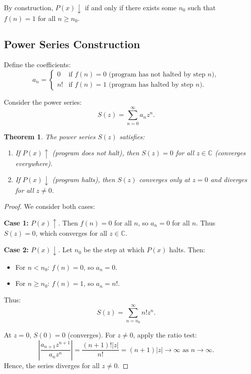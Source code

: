 \documentclass[12pt, a4paper]{article}
\newtheorem{theorem}{Theorem}
\begin{document}
By construction, $P(x)\downarrow$ if and only if there exists some $n_0$ such that $f(n) = 1$ for all $n \geq n_0$.

\subsection{Power Series Construction}
Define the coefficients:
\[
a_n = 
\begin{cases}
0 & \text{if } f(n) = 0 \text{ (program has not halted by step } n), \\
n! & \text{if } f(n) = 1 \text{ (program has halted by step } n).
\end{cases}
\]

Consider the power series:
\[
S(z) = \sum_{n=0}^{\infty} a_n z^n.
\]

\begin{theorem}
The power series $S(z)$ satisfies:
\begin{enumerate}
\item If $P(x)\uparrow$ (program does not halt), then $S(z) = 0$ for all $z \in \mathbb{C}$ (converges everywhere).
\item If $P(x)\downarrow$ (program halts), then $S(z)$ converges only at $z = 0$ and diverges for all $z \neq 0$.
\end{enumerate}
\end{theorem}

\begin{proof}
We consider both cases:

\textbf{Case 1:} $P(x)\uparrow$. Then $f(n) = 0$ for all $n$, so $a_n = 0$ for all $n$. Thus $S(z) = 0$, which converges for all $z \in \mathbb{C}$.

\textbf{Case 2:} $P(x)\downarrow$. Let $n_0$ be the step at which $P(x)$ halts. Then:
\begin{itemize}
\item For $n < n_0$: $f(n) = 0$, so $a_n = 0$.
\item For $n \geq n_0$: $f(n) = 1$, so $a_n = n!$.
\end{itemize}

Thus:
\[
S(z) = \sum_{n=n_0}^{\infty} n! z^n.
\]

At $z = 0$, $S(0) = 0$ (converges). For $z \neq 0$, apply the ratio test:
\[
\left| \frac{a_{n+1}z^{n+1}}{a_n z^n} \right| = \frac{(n+1)!|z|}{n!} = (n+1)|z| \to \infty \text{ as } n \to \infty.
\]
Hence, the series diverges for all $z \neq 0$.
\end{proof}
\end{document}
